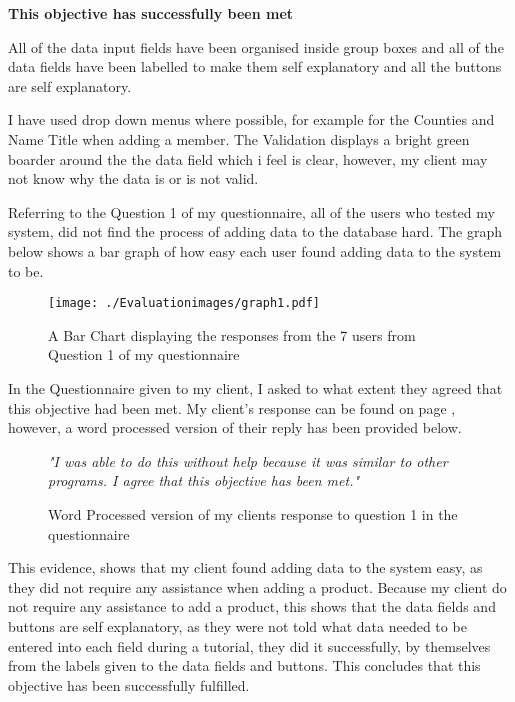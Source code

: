 \textbf{\large{This objective has successfully been met}}

All of the data input fields have been organised inside group boxes and all of the data fields have been labelled to make them self explanatory and all the buttons are self explanatory.

I have used drop down menus where possible, for example for the Counties and Name Title when adding a member. The Validation displays a bright green boarder around the the data field which i feel is clear, however, my client may not know why the data is or is not valid.

Referring to the Question 1 of my questionnaire, all of the users who tested my system, did not find the process of adding data to the database hard. The graph below shows a bar graph of how easy each user found adding data to the system to be.

\begin{figure}[H]
\caption{A Bar Chart displaying the responses from the 7 users from Question 1 of my questionnaire}
\hfill\texttt{[image: ./Evaluationimages/graph1.pdf]}
\end{figure}


In the Questionnaire given to my client, I asked to what extent they agreed that this objective had been met. My client's response can be found on page \pageref{Client-Q1}, however, a word processed version of their reply has been provided below.

\begin{figure}[H]
\caption{Word Processed version of my clients response to question 1 in the questionnaire} \label{client-evidence-Q1}
\vspace{3mm}
\textit{\large{"I was able to do this without help because it was similar to other programs. I agree that this objective has been met."}}
\vspace{3mm}
\end{figure}

This evidence, shows that my client found adding data to the system easy, as they did not require any assistance when adding a product. Because my client do not require any assistance to add a product, this shows that the data fields and buttons are self explanatory, as they were not told what data needed to be entered into each field during a tutorial, they did it successfully, by themselves from the labels given to the data fields and buttons. This concludes that this objective has been successfully fulfilled.


